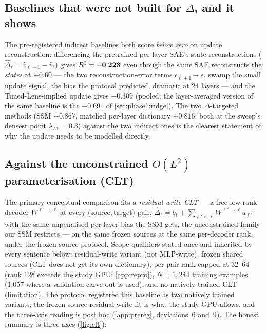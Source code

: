 \subsection{Baselines that were not built for
\texorpdfstring{$\Delta$}{Delta}, and it shows}
\label{sec:evaluation:baselines}

The pre-registered indirect baselines both score \emph{below zero} on
update reconstruction: differencing the pretrained per-layer SAE's state
reconstructions ($\hat\Delta_\ell = \hat v_{\ell+1} - \hat v_\ell$) gives
$R^2 = \mathbf{-0.223}$ even though the same SAE reconstructs the
\emph{states} at $+0.60$ --- the two reconstruction-error terms
$\epsilon_{\ell+1}-\epsilon_\ell$ swamp the small update signal, the bias the
protocol predicted, dramatic at 24 layers --- and the Tuned-Lens-implied
update gives $\mathbf{-0.309}$ (pooled; the layer-averaged version of the same
baseline is the $-0.691$ of \cref{sec:phase1:ridge}). The two
$\Delta$-targeted methods (SSM
$+0.867$, matched per-layer dictionary $+0.816$, both at the sweep's densest
point $\lambda_{L1}{=}0.3$) against the two indirect
ones is the clearest statement of why the update needs to be modelled
directly.

\subsection{Against the unconstrained \texorpdfstring{$O(L^2)$}{O(L2)}
parameterisation (CLT)}
\label{sec:evaluation:clt}

The primary conceptual comparison fits a \emph{residual-write CLT} --- a free
low-rank decoder $W^{\ell'\to\ell}$ at every (source,\,target) pair,
$\hat\Delta_\ell = b_\ell + \sum_{\ell' \le \ell} W^{\ell'\to\ell} u_{\ell'}$
with the same unpenalised per-layer bias the SSM gets, the
unconstrained family our SSM restricts --- on the same frozen sources at the
same per-decoder rank, under the frozen-source protocol. Scope qualifiers
stated once and inherited by every sentence below: residual-write variant (not
MLP-write), frozen shared sources (CLT does not get its own dictionary),
per-pair rank capped at 32--64 (rank 128 exceeds the study GPU;
\cref{app:repro}), $N = 1{,}244$ training examples (1{,}057 where a validation
carve-out is used), and no natively-trained
CLT (limitation). The protocol registered this baseline as two natively
trained variants; the frozen-source residual-write fit is what the study GPU
allows, and the three-axis reading is post hoc (\cref{app:prereg},
deviations~6 and~9). The honest summary is three axes (\cref{fig:clt}):


